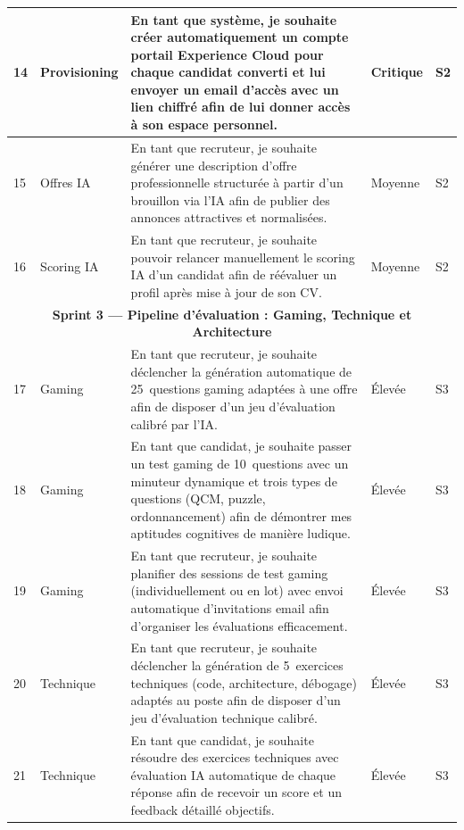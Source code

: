 \begin{longtable}{|p{0.6cm}|p{2.5cm}|p{7.5cm}|p{1.3cm}|p{1.3cm}|}
14 & Provisioning & En tant que système, je souhaite créer automatiquement un compte portail Experience Cloud pour chaque candidat converti et lui envoyer un email d'accès avec un lien chiffré afin de lui donner accès à son espace personnel. & Critique & S2 \\
\hline

15 & Offres IA & En tant que recruteur, je souhaite générer une description d'offre professionnelle structurée à partir d'un brouillon via l'IA afin de publier des annonces attractives et normalisées. & Moyenne & S2 \\
\hline

16 & Scoring IA & En tant que recruteur, je souhaite pouvoir relancer manuellement le scoring IA d'un candidat afin de réévaluer un profil après mise à jour de son CV. & Moyenne & S2 \\
\hline

\multicolumn{5}{|c|}{\cellcolor{orange!10}\textbf{Sprint 3 --- Pipeline d'évaluation : Gaming, Technique et Architecture}} \\
\hline

17 & Gaming & En tant que recruteur, je souhaite déclencher la génération automatique de 25~questions gaming adaptées à une offre afin de disposer d'un jeu d'évaluation calibré par l'IA. & Élevée & S3 \\
\hline

18 & Gaming & En tant que candidat, je souhaite passer un test gaming de 10~questions avec un minuteur dynamique et trois types de questions (QCM, puzzle, ordonnancement) afin de démontrer mes aptitudes cognitives de manière ludique. & Élevée & S3 \\
\hline

19 & Gaming & En tant que recruteur, je souhaite planifier des sessions de test gaming (individuellement ou en lot) avec envoi automatique d'invitations email afin d'organiser les évaluations efficacement. & Élevée & S3 \\
\hline

20 & Technique & En tant que recruteur, je souhaite déclencher la génération de 5~exercices techniques (code, architecture, débogage) adaptés au poste afin de disposer d'un jeu d'évaluation technique calibré. & Élevée & S3 \\
\hline

21 & Technique & En tant que candidat, je souhaite résoudre des exercices techniques avec évaluation IA automatique de chaque réponse afin de recevoir un score et un feedback détaillé objectifs. & Élevée & S3 \\
\hline


\end{longtable}
